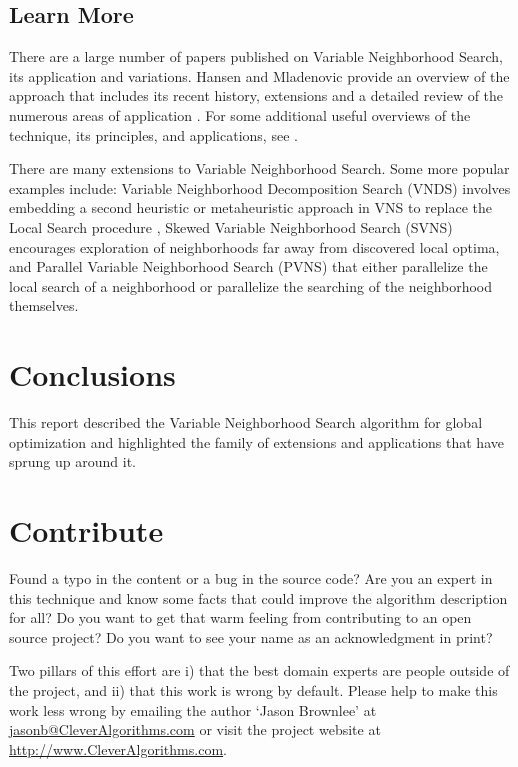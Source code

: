 \documentclass[a4paper, 11pt]{article}
\makeatletter
\newcommand{\myreportauthor}{Jason Brownlee}
\newcommand{\myreportemail}{jasonb@CleverAlgorithms.com}
\newcommand{\myreportwebsite}{http://www.CleverAlgorithms.com}
\makeatother
\begin{document}
% 
% 
\subsection{Learn More}
There are a large number of papers published on Variable Neighborhood Search, its application and variations.
Hansen and Mladenovic provide an overview of the approach that includes its recent history, extensions and a detailed review of the numerous areas of application \cite{Hansen2003}. 
For some additional useful overviews of the technique, its principles, and applications, see \cite{Hansen1998, Hansen2001a, Hansen2002, Perez2006}.

There are many extensions to Variable Neighborhood Search. Some more popular examples include: Variable Neighborhood Decomposition Search (VNDS) involves embedding a second heuristic or metaheuristic approach in VNS to replace the Local Search procedure \cite{Hansen2001}, Skewed Variable Neighborhood Search (SVNS) encourages exploration of neighborhoods far away from discovered local optima, and Parallel Variable Neighborhood Search (PVNS) that either parallelize the local search of a neighborhood or parallelize the searching of the neighborhood themselves.

% 
% 
\section{Conclusions}
\label{sec:conclusions}
This report described the Variable Neighborhood Search algorithm for global optimization and highlighted the family of extensions and applications that have sprung up around it.


% 
% 
\section{Contribute}
\label{sec:contribute}
Found a typo in the content or a bug in the source code? 
Are you an expert in this technique and know some facts that could improve the algorithm description for all?
Do you want to get that warm feeling from contributing to an open source project? 
Do you want to see your name as an acknowledgment in print?

Two pillars of this effort are i) that the best domain experts are people outside of the project, and ii) that this work is wrong by default. 
Please help to make this work less wrong by emailing the author `\myreportauthor' at \url{\myreportemail} or visit the project website at \url{\myreportwebsite}.



\end{document}
